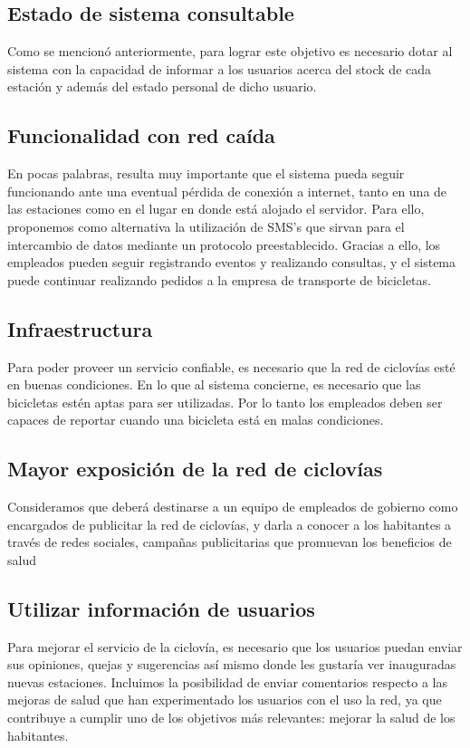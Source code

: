 \subsection{Estado de sistema consultable}

Como se mencionó anteriormente, para lograr este objetivo es necesario dotar al sistema con la capacidad de informar a los usuarios acerca del stock de cada estación y además del estado personal de dicho usuario.

\subsection{Funcionalidad con red caída}

En pocas palabras, resulta muy importante que el sistema pueda seguir funcionando ante una eventual pérdida de conexión a
internet, tanto en una de las estaciones como en el lugar en donde está alojado el servidor. Para ello, proponemos como 
alternativa la utilización de SMS's que sirvan para el intercambio de datos mediante un protocolo preestablecido.
Gracias a ello, los empleados pueden seguir registrando eventos y realizando consultas, y el sistema puede continuar 
realizando pedidos a la empresa de transporte de bicicletas.

\subsection{Infraestructura}

Para poder proveer un servicio confiable, es necesario que la red de ciclovías esté en buenas condiciones. En lo que al sistema
concierne, es necesario que las bicicletas estén aptas para ser utilizadas. Por lo tanto los empleados deben ser capaces de
reportar cuando una bicicleta está en malas condiciones.  

\subsection{Mayor exposición de la red de ciclovías}

Consideramos que deberá destinarse a un 
equipo de empleados de gobierno como encargados de publicitar la red de ciclovías, y darla a conocer a los habitantes a través de redes sociales, campañas publicitarias que promuevan los beneficios de salud

\subsection{Utilizar información de usuarios}

Para mejorar el servicio de la ciclovía, es necesario que los usuarios puedan enviar sus opiniones, quejas y sugerencias así
mismo donde les gustaría ver inauguradas nuevas estaciones. Incluimos la posibilidad de enviar comentarios respecto a las 
mejoras de salud que han experimentado los usuarios con el uso la red, ya que contribuye a cumplir uno de los objetivos
más relevantes: mejorar la salud de los habitantes.












